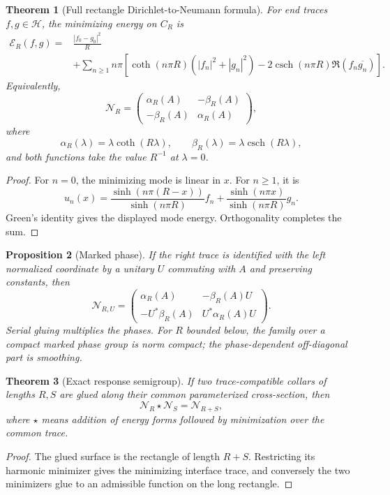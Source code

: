 \documentclass[10pt]{article}
\newtheorem{theorem}{Theorem}[section]
\newtheorem{proposition}[theorem]{Proposition}
\theoremstyle{definition}
\theoremstyle{remark}
\newcommand{\csch}{\operatorname{csch}}
\begin{document}
\begin{theorem}[Full rectangle Dirichlet-to-Neumann formula]
For end traces $f,g\in\mathcal H$, the minimizing energy on $C_R$ is
\[
\begin{aligned}
 \mathcal E_R(f,g)
 ={}&\frac{|f_0-g_0|^2}{R}\\
 &+\sum_{n\ge1}n\pi\left[
 \coth(n\pi R)(|f_n|^2+|g_n|^2)
 -2\csch(n\pi R)\Re(f_n\overline{g_n})
 \right].
\end{aligned}
\tag{3.3}
\]
Equivalently,
\[
 \mathcal N_R=
 \begin{pmatrix}
 \alpha_R(A)&-\beta_R(A)\\
 -\beta_R(A)&\alpha_R(A)
 \end{pmatrix},
\tag{3.4}
\]
where
\[
 \alpha_R(\lambda)=\lambda\coth(R\lambda),\qquad
 \beta_R(\lambda)=\lambda\csch(R\lambda),
\tag{3.5}
\]
and both functions take the value $R^{-1}$ at $\lambda=0$.
\end{theorem}

\begin{proof}
For $n=0$, the minimizing mode is linear in $x$. For $n\ge1$, it is
\[
 u_n(x)=
 \frac{\sinh(n\pi(R-x))}{\sinh(n\pi R)}f_n
 +\frac{\sinh(n\pi x)}{\sinh(n\pi R)}g_n.
\]
Green's identity gives the displayed mode energy. Orthogonality completes the
sum.
\end{proof}

\begin{proposition}[Marked phase]
If the right trace is identified with the left normalized coordinate by a
unitary $U$ commuting with $A$ and preserving constants, then
\[
 \mathcal N_{R,U}=
 \begin{pmatrix}
 \alpha_R(A)&-\beta_R(A)U\\
 -U^*\beta_R(A)&U^*\alpha_R(A)U
 \end{pmatrix}.
\tag{3.6}
\]
Serial gluing multiplies the phases. For $R$ bounded below, the family over a
compact marked phase group is norm compact; the phase-dependent off-diagonal
part is smoothing.
\end{proposition}

\begin{theorem}[Exact response semigroup]
If two trace-compatible collars of lengths $R,S$ are glued along their common
parameterized cross-section, then
\[
 \boxed{\mathcal N_R\star\mathcal N_S=\mathcal N_{R+S},}
\tag{3.7}
\]
where $\star$ means addition of energy forms followed by minimization over the
common trace.
\end{theorem}

\begin{proof}
The glued surface is the rectangle of length $R+S$. Restricting its harmonic
minimizer gives the minimizing interface trace, and conversely the two
minimizers glue to an admissible function on the long rectangle.
\end{proof}
\end{document}
